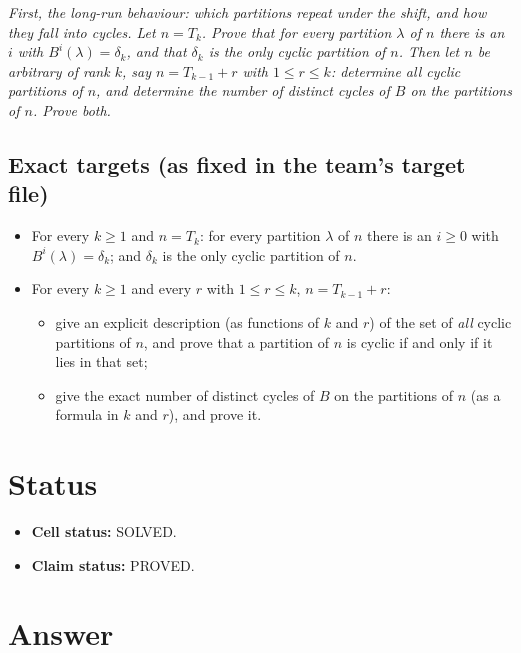 \documentclass[11pt]{article}
\begin{document}
\emph{First, the long-run behaviour: which partitions repeat under the shift, and how they fall into cycles.
Let $n=T_k$. Prove that for every partition $\lambda$ of $n$ there is an $i$ with $B^i(\lambda)=\delta_k$, and
that $\delta_k$ is the only cyclic partition of $n$. Then let $n$ be arbitrary of rank $k$, say
$n=T_{k-1}+r$ with $1\le r\le k$: determine all cyclic partitions of $n$, and determine the number of
distinct cycles of $B$ on the partitions of $n$. Prove both.}

\subsection*{Exact targets (as fixed in the team's target file)}

\begin{itemize}
\item[(i)] For every $k\ge1$ and $n=T_k$: for every partition $\lambda$ of $n$ there is an $i\ge0$ with
$B^i(\lambda)=\delta_k$; and $\delta_k$ is the only cyclic partition of $n$.
\item[(ii)] For every $k\ge1$ and every $r$ with $1\le r\le k$, $n=T_{k-1}+r$:
\begin{itemize}
\item[(a)] give an explicit description (as functions of $k$ and $r$) of the set of \emph{all} cyclic
partitions of $n$, and prove that a partition of $n$ is cyclic if and only if it lies in that set;
\item[(b)] give the exact number of distinct cycles of $B$ on the partitions of $n$ (as a formula in $k$
and $r$), and prove it.
\end{itemize}
\end{itemize}

\section{Status}

\begin{itemize}
\item \textbf{Cell status:} SOLVED.
\item \textbf{Claim status:} PROVED.
\end{itemize}

\section{Answer}
\end{document}

